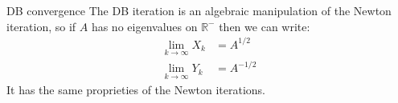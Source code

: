 \documentclass{beamer}
\theoremstyle{plain}
\theoremstyle{definition}
\theoremstyle{remark}
\begin{document}
\begin{frame}{DB convergence}
  The DB iteration is an algebraic manipulation of the Newton
  iteration, so if $A$ has no eigenvalues on $\mathbb{R}^-$ then we
  can write:
  \begin{align*}
    \lim _{k \to \infty} X_k &= A^{1/2} \\
    \lim _{k\to \infty} Y_k &= A^{-1/2}
  \end{align*}  
  It has the same proprieties of the Newton iterations.

\end{frame}
\end{document}

